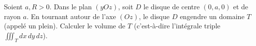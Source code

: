\begin{exercice}\label{exoIntegralesMultiples0013}

	Soient $a,R>0$. Dans le plan $(yOz)$, soit $D$ le disque de centre $(0,a,0)$ et de rayon $a$. En tournant autour de l'axe $(Oz)$, le disque $D$ engendre un domaine $T$ (appelé un  plein). Calculer le volume de $T$ (c'est-à-dire l'intégrale triple $\iiint_T dx\, dy\, dz$).

\end{exercice}
